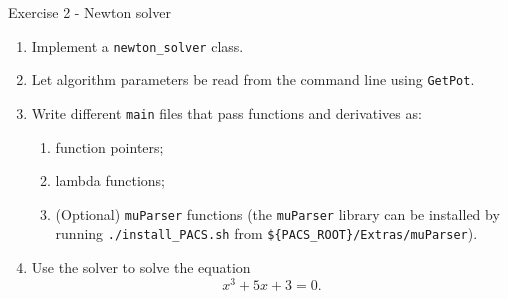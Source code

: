 \documentclass[10pt]{beamer}
\begin{document}
\begin{frame}{Exercise 2 - Newton solver}
\begin{enumerate}
\item Implement a \texttt{newton\_solver} class.
\item Let algorithm parameters be read from the command line using \texttt{GetPot}.
\item Write different \texttt{main} files that pass functions and derivatives as:
\begin{enumerate}
\item function pointers;
\item lambda functions;
\item (Optional) \texttt{muParser} functions (the \texttt{muParser} library can be installed by running \texttt{./install\_PACS.sh} from \texttt{\$\{PACS\_ROOT\}/Extras/muParser}).
\end{enumerate}
\item Use the solver to solve the equation
\begin{equation*}
x^3 + 5 x + 3 = 0.
\end{equation*}
\end{enumerate}
\end{frame}
\end{document}
